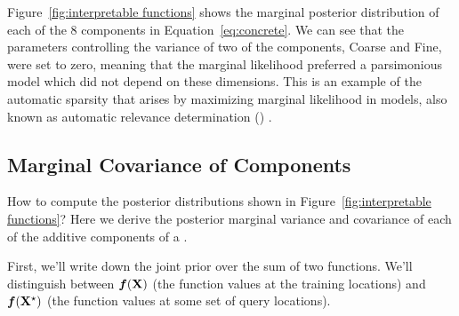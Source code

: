 Figure~\ref{fig:interpretable functions} shows the marginal posterior distribution of each of the 8 components in Equation~\eqref{eq:concrete}.
We can see that the parameters controlling the variance of two of the components, Coarse and Fine, were set to zero, meaning that the marginal likelihood preferred a parsimonious model which did not depend on these dimensions.
This is an example of the automatic sparsity that arises by maximizing marginal likelihood in \gp{} models, also known as automatic relevance determination (\ARD) \citep{neal1995bayesian}.



\subsection{Marginal Covariance of Components}

How to compute the posterior distributions shown in Figure~\ref{fig:interpretable functions}?
Here we derive the posterior marginal variance and covariance of each of the additive components of a \gp{}.


First, we'll write down the joint prior over the sum of two functions.
We'll distinguish between $\boldsymbol{f}(\mathbf{X})$ (the function values at the training locations) and  $\boldsymbol{f}(\mathbf{X}^\star)$ (the function values at some set of query locations).

